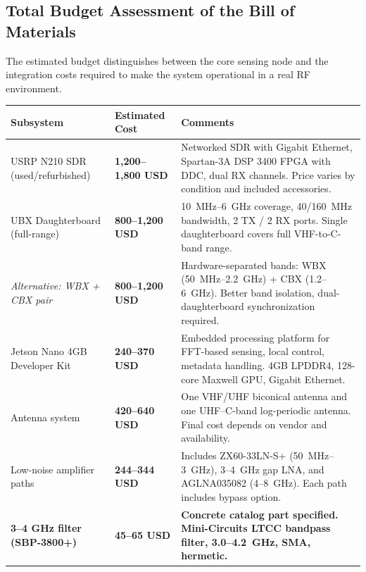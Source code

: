 \documentclass[11pt,a4paper]{article}
\newcommand{\blue}[1]{\textcolor{priceblue}{\textbf{#1}}}
\begin{document}
	\subsection*{Total Budget Assessment of the Bill of Materials}
	
	The estimated budget distinguishes between the core sensing node and the
	integration costs required to make the system operational in a real RF
	environment.
	
	\begin{table}[htbp]
		\centering
		\scriptsize
		\begin{tabular}{p{5.4cm}p{2.8cm}p{5.7cm}}
			\toprule
			\textbf{Subsystem} &
			\textbf{Estimated Cost} &
			\textbf{Comments} \\
			\midrule
			
			USRP N210 SDR (used/refurbished) &
			\blue{1,200--1,800 USD} &
			Networked SDR with Gigabit Ethernet, Spartan-3A DSP 3400 FPGA with DDC,
			dual RX channels. Price varies by condition and included accessories. \\
			
			UBX Daughterboard (full-range) &
			\blue{800--1,200 USD} &
			10~MHz--6~GHz coverage, 40/160~MHz bandwidth, 2 TX / 2 RX ports.
			Single daughterboard covers full VHF-to-C-band range. \\
			
			\textit{Alternative: WBX + CBX pair} &
			\blue{800--1,200 USD} &
			Hardware-separated bands: WBX (50~MHz--2.2~GHz) + CBX (1.2--6~GHz).
			Better band isolation, dual-daughterboard synchronization required. \\
			
			Jetson Nano 4GB Developer Kit &
			\blue{240--370 USD} &
			Embedded processing platform for FFT-based sensing, local control,
			metadata handling. 4GB LPDDR4, 128-core Maxwell GPU, Gigabit Ethernet. \\
			
			Antenna system &
			\blue{420--640 USD} &
			One VHF/UHF biconical antenna and one UHF--C-band log-periodic antenna.
			Final cost depends on vendor and availability. \\
			
			Low-noise amplifier paths &
			\blue{244--344 USD} &
			Includes ZX60-33LN-S+ (50~MHz--3~GHz), 3--4~GHz gap LNA, and AGLNA035082
			(4--8~GHz). Each path includes bypass option. \\
			
			\textbf{3--4 GHz filter (SBP-3800+)} &
			\blue{45--65 USD} &
			\textbf{Concrete catalog part specified. Mini-Circuits LTCC bandpass
				filter, 3.0--4.2~GHz, SMA, hermetic.} \\
			

\end{tabular}
\end{table}
\end{document}
